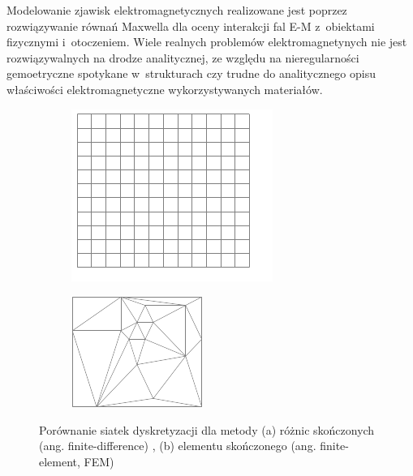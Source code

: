 Modelowanie zjawisk elektromagnetycznych realizowane jest poprzez rozwiązywanie równań Maxwella dla oceny interakcji fal E-M z~obiektami fizycznymi i~otoczeniem. Wiele realnych problemów elektromagnetynych nie jest rozwiązywalnych na drodze analitycznej, ze względu na nieregularności gemoetryczne spotykane w~strukturach czy trudne do analitycznego opisu właściwości elektromagnetyczne wykorzystywanych materiałów.


\begin{figure}[tb]
	\centering
	\begin{subfigure}{0.45\textwidth}
		\includegraphics[width=\textwidth]{images/wstep/fdtd.png}
		\caption{}
		\label{fig:wstep-fdtd-dic}
	\end{subfigure}
	\begin{subfigure}{0.45\textwidth}
		\includegraphics[width=\textwidth]{images/wstep/fem.png}
		\caption{}
		\label{fig:wstep-fem-dic}
		
	\end{subfigure}
	\caption{Porównanie siatek dyskretyzacji dla metody (a) różnic skończonych (ang. finite-difference) , (b) elementu skończonego (ang. finite-element, FEM)}
\end{figure}

